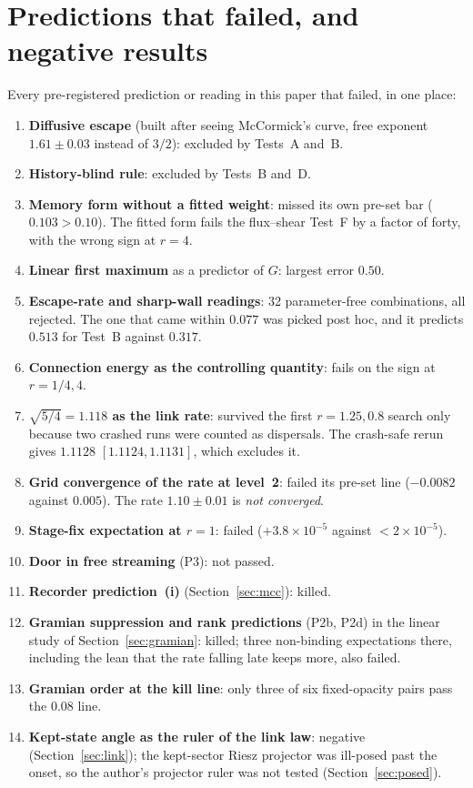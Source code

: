 \section{Predictions that failed, and negative results}\label{sec:failed}

Every pre-registered prediction or reading in this paper that failed, in one place:
\begin{enumerate}
\item \textbf{Diffusive escape} (built after seeing McCormick's curve, free exponent $1.61\pm0.03$ instead of $3/2$): excluded by Tests~A and~B.
\item \textbf{History-blind rule}: excluded by Tests~B and~D.
\item \textbf{Memory form without a fitted weight}: missed its own pre-set bar ($0.103>0.10$). The fitted form fails the flux--shear Test~F by a factor of forty, with the wrong sign at $r=4$.
\item \textbf{Linear first maximum} as a predictor of $G$: largest error $0.50$.
\item \textbf{Escape-rate and sharp-wall readings}: 32 parameter-free combinations, all rejected. The one that came within $0.077$ was picked post hoc, and it predicts $0.513$ for Test~B against $0.317$.
\item \textbf{Connection energy as the controlling quantity}: fails on the sign at $r=1/4,4$.
\item \textbf{$\sqrt{5/4}=1.118$ as the link rate}: survived the first $r=1.25,0.8$ search only because two crashed runs were counted as dispersals. The crash-safe rerun gives $1.1128$ $[1.1124,1.1131]$, which excludes it.
\item \textbf{Grid convergence of the rate at level~2}: failed its pre-set line ($-0.0082$ against $0.005$). The rate $1.10\pm0.01$ is \emph{not converged}.
\item \textbf{Stage-fix expectation at $r=1$}: failed ($+3.8\times10^{-5}$ against $<2\times10^{-5}$).
\item \textbf{Door in free streaming} (P3): not passed.
\item \textbf{Recorder prediction~(i)} (Section~\ref{sec:mcc}): killed.
\item \textbf{Gramian suppression and rank predictions} (P2b, P2d) in the linear study of Section~\ref{sec:gramian}: killed; three non-binding expectations there, including the lean that the rate falling late keeps more, also failed.
\item \textbf{Gramian order at the kill line}: only three of six fixed-opacity pairs pass the $0.08$ line.
\item \textbf{Kept-state angle as the ruler of the link law}: negative (Section~\ref{sec:link}); the kept-sector Riesz projector was ill-posed past the onset, so the author's projector ruler was not tested (Section~\ref{sec:posed}).
\end{enumerate}

